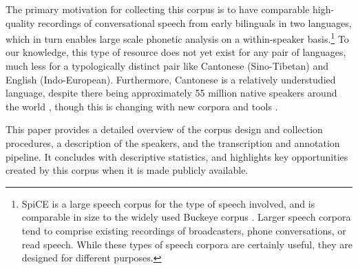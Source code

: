 The primary motivation for collecting this corpus is to have comparable high-quality recordings of conversational speech from early bilinguals in two languages, which in turn enables large scale phonetic analysis on a within-speaker basis.\footnote{SpiCE is a large speech corpus for the type of speech involved, and is comparable in size to the widely used Buckeye corpus \citep{pitt_2005_buckeye}. Larger speech corpora tend to comprise existing recordings of broadcasters, phone conversations, or read speech. While these types of speech corpora are certainly useful, they are designed for different purposes.} To our knowledge, this type of resource does not yet exist for any pair of languages, much less for a typologically distinct pair like Cantonese (Sino-Tibetan) and English (Indo-European). Furthermore, Cantonese is a relatively understudied language, despite there being approximately 55 million native speakers around the world \citep{matthews_2013_cantonese}, though this is changing with new corpora \citep{luke_2015_hkc} and tools \citep{lee_2018_pycantonese}.

This paper provides a detailed overview of the corpus design and collection procedures, a description of the speakers, and the transcription and annotation pipeline. It concludes with descriptive statistics, and highlights key opportunities created by this corpus when it is made publicly available. 

